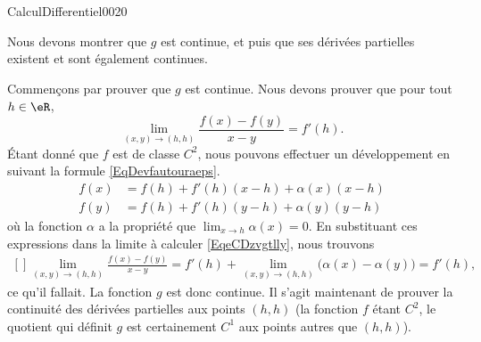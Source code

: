 \begin{corrige}{CalculDifferentiel0020}

	Nous devons montrer que $g$ est continue, et puis que ses dérivées partielles existent et sont également continues.
	
	Commençons par prouver que $g$ est continue. Nous devons prouver que pour tout $h\in\eR$,
	\begin{equation}		\label{EqeCDzvgtlly}
		\lim_{(x,y)\to(h,h)}\frac{ f(x)-f(y) }{ x-y }=f'(h).
	\end{equation}
	Étant donné que $f$ est de classe $C^2$, nous pouvons effectuer un développement en suivant la formule \eqref{EqDevfautouraeps}.
	\begin{subequations}
		\begin{align}
			f(x)&=f(h)+f'(h)(x-h)+\alpha(x)(x-h)		\label{EqeCDzzszfx}\\
			f(y)&=f(h)+f'(h)(y-h)+\alpha(y)(y-h)
		\end{align}
	\end{subequations}
	où la fonction $\alpha$ a la propriété que $\lim_{x\to h} \alpha(x)=0$. En substituant ces expressions dans la limite à calculer \eqref{EqeCDzvgtlly}, nous trouvons
	\begin{equation}
		\begin{aligned}[]
			\lim_{(x,y)\to(h,h)}\frac{ f(x)-f(y) }{ x-y }=f'(h)+\lim_{(x,y)\to(h,h)}\big( \alpha(x)-\alpha(y) \big)=f'(h),
		\end{aligned}
	\end{equation}
	ce qu'il fallait. La fonction $g$ est donc continue. Il s'agit maintenant de prouver la continuité des dérivées partielles aux points $(h,h)$ (la fonction $f$ étant $C^2$, le quotient qui définit $g$ est certainement $C^1$ aux points autres que $(h,h)$).


\end{corrige}
